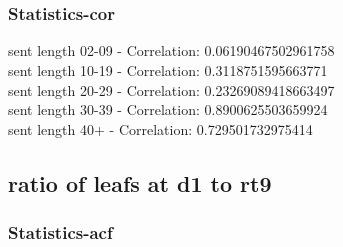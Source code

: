 \documentclass{article}%
\begin{document}
\begin{figure}[ht]%
\centering%
\setlength{\abovecaptionskip}{-35pt}%
%
%
\\%
%
%
\\%
%
\end{figure}

%
\newpage%
\subsubsection{Statistics{-}cor}%
\label{ssubsec:Statistics{-}cor}%
\noindent%
sent length 02-09 - Correlation: 0.06190467502961758\\%
sent length 10-19 - Correlation: 0.3118751595663771\\%
sent length 20-29 - Correlation: 0.23269089418663497\\%
sent length 30-39 - Correlation: 0.8900625503659924\\%
sent length 40+ - Correlation: 0.729501732975414\\

%
\newpage

%
\subsection{ratio of leafs at d1 to rt9}%
\label{subsec:ratioofleafsatd1tort9}%
\subsubsection{Statistics{-}acf}%
\label{ssubsec:Statistics{-}acf}%
\end{document}
